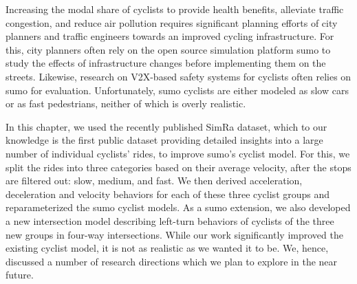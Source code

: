 Increasing the modal share of cyclists to provide health benefits, alleviate traffic congestion, and reduce air pollution requires significant planning efforts of city planners and traffic engineers towards an improved cycling infrastructure.
For this, city planners often rely on the open source simulation platform \ac{sumo} to study the effects of infrastructure changes before implementing them on the streets.
Likewise, research on V2X-based safety systems for cyclists often relies on \ac{sumo} for evaluation.
Unfortunately, \ac{sumo} cyclists are either modeled as slow cars or as fast pedestrians, neither of which is overly realistic.

In this chapter, we used the recently published SimRa dataset, which to our knowledge is the first public dataset providing detailed insights into a large number of individual cyclists' rides, to improve \ac{sumo}'s cyclist model.
For this, we split the rides into three categories based on their average velocity, after the stops are filtered out: slow, medium, and fast.
We then derived acceleration, deceleration and velocity behaviors for each of these three cyclist groups and reparameterized the \ac{sumo} cyclist models.
As a \ac{sumo} extension, we also developed a new intersection model describing left-turn behaviors of cyclists of the three new groups in four-way intersections.
While our work significantly improved the existing cyclist model, it is not as realistic as we wanted it to be.
We, hence, discussed a number of research directions which we plan to explore in the near future.
